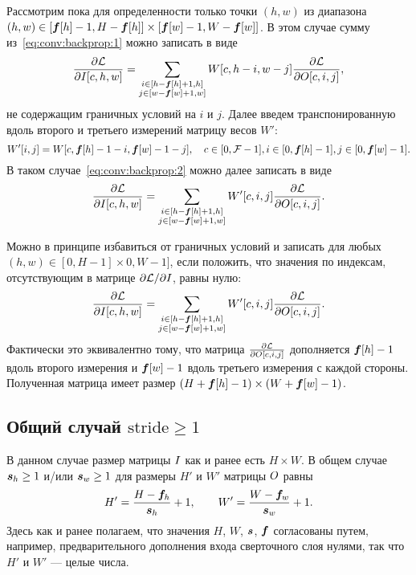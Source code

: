 \documentclass{report}
\numberwithin{theorem}{chapter}
\numberwithin{statement}{chapter}
\numberwithin{lemma}{chapter}
\theoremstyle{definition}
\numberwithin{task}{chapter}
\theoremstyle{remark}
\numberwithin{example}{chapter}
\theoremstyle{definition}
\numberwithin{definition}{chapter}
\theoremstyle{remark}
\theoremstyle{remark}
\numberwithin{lyrics}{section}
\begin{document}
Рассмотрим пока для определенности только точки $(h, w)$ из диапазона $(h, w) \in [\boldsymbol{f}[h] - 1, H - \boldsymbol{f}[h]] \times [\boldsymbol{f}[w] - 1, W - \boldsymbol{f}[w]]$. В этом случае сумму из~\eqref{eq:conv:backprop:1} можно записать в виде
\begin{equation}
\label{eq:conv:backprop:2}
\frac{\partial \mathcal{L} }{\partial I[c, h, w]} = \sum\limits_{\substack{i \in [h - \boldsymbol{f}[h] + 1, h] \\ j \in [w - \boldsymbol{f}[w] + 1, w]}} W[c, h - i, w - j] \frac{\partial \mathcal{L} }{\partial O[c, i, j]},
\end{equation}
не содержащим граничных условий на $i$ и $j$. Далее введем транспонированную вдоль второго и третьего измерений матрицу весов $W'$:
\begin{equation}
W'[i, j] = W[c, \boldsymbol{f}[h] - 1 - i, \boldsymbol{f}[w] - 1 - j], \quad c \in [0, \mathcal{F} - 1], i \in [0, \boldsymbol{f}[h] - 1], j \in [0, \boldsymbol{f}[w] - 1].
\end{equation}
В таком случае~\eqref{eq:conv:backprop:2} можно далее записать в виде
\begin{equation}
\frac{\partial \mathcal{L} }{\partial I[c, h, w]} = \sum\limits_{\substack{i \in [h - \boldsymbol{f}[h] + 1, h] \\ j \in [w - \boldsymbol{f}[w] + 1, w]}} W'[c, i, j] \frac{\partial \mathcal{L} }{\partial O[c, i, j]}.
\end{equation}

Можно в принципе избавиться от граничных условий и записать для любых $(h, w) \in [0, H - 1] \times 0, W - 1]$, если положить, что значения по индексам, отсутствующим в матрице $\partial \mathcal{L} / \partial I$, равны нулю:
\begin{equation}
\frac{\partial \mathcal{L} }{\partial I[c, h, w]} = \sum\limits_{\substack{i \in [h - \boldsymbol{f}[h] + 1, h] \\ j \in [w - \boldsymbol{f}[w] + 1, w]}} W'[c, i, j] \frac{\partial \mathcal{L} }{\partial O[c, i, j]}.
\end{equation}
Фактически это эквивалентно тому, что матрица $\frac{\partial \mathcal{L} }{\partial O[c, i, j]}$ дополняется $\boldsymbol{f}[h] - 1$ вдоль второго измерения и $\boldsymbol{f}[w] - 1$ вдоль третьего измерения с каждой стороны. Полученная матрица имеет размер $(H + \boldsymbol{f}[h] - 1) \times (W + \boldsymbol{f}[w] - 1)$. 

\subsection{Общий случай $\text{stride} \ge 1$}
В данном случае размер матрицы $I$ как и ранее есть $H \times W$. В общем случае $\boldsymbol{s}_h \ge 1$ и/или $\boldsymbol{s}_w \ge 1$ для размеры $H' $ и $W'$ матрицы $O$ равны
\begin{equation}
H' = \frac{H - \boldsymbol{f}_h}{\boldsymbol{s}_h} + 1, \qquad W' = \frac{W - \boldsymbol{f}_w}{\boldsymbol{s}_w} + 1.
\end{equation}
Здесь как и ранее полагаем, что значения $H$, $W$, $\boldsymbol{s}$, $\boldsymbol{f}$ согласованы путем, например, предварительного дополнения входа сверточного слоя нулями, так что $H'$  и $W'$ --- целые числа.
\end{document}

